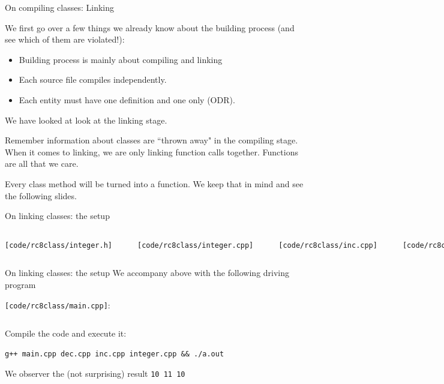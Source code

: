 \begin{frame}{On compiling classes: Linking}

We first go over a few things we already know about the building process (and see which of them are violated!):
\begin{itemize}
	\item Building process is mainly about compiling and linking
	\item Each source file compiles independently.
	\item Each entity must have one definition and one only (ODR).
\end{itemize}

We have looked at  look at the linking stage. 

\vspace{.05in}
Remember information about classes are ``thrown away" in the compiling stage. When it comes to linking, we are only linking function calls together. Functions are all that we care.

\vspace{.05in}	
Every class method will be turned into a function. We keep that in mind and see the following slides.
\end{frame}

\begin{frame}[fragile]{On linking classes: the setup}
\begin{columns}
	
\vspace{-.25in}
\texttt{[code/rc8class/integer.h]}
\inputminted[fontsize=\small, baselinestretch=.9]{c++}{code/rc8class/integer.h}

\texttt{[code/rc8class/integer.cpp]}
\inputminted[]{c++}{code/rc8class/integer.cpp}

	
\vspace{-.25in}
\texttt{[code/rc8class/inc.cpp]}
\inputminted[frame=single]{c++}{code/rc8class/inc.cpp}

\texttt{[code/rc8class/dec.cpp]}
\inputminted[frame=single]{c++}{code/rc8class/dec.cpp}
\end{columns}
\end{frame}

\begin{frame}[fragile]{On linking classes: the setup}
We accompany above with the following driving program

\texttt{[code/rc8class/main.cpp]}:
\inputminted[]{c++}{code/rc8class/main.cpp}

Compile the code and execute it:
\begin{verbatim}
g++ main.cpp dec.cpp inc.cpp integer.cpp && ./a.out
\end{verbatim}
We observer the (not surprising) result \texttt{10 11 10}
\end{frame}

